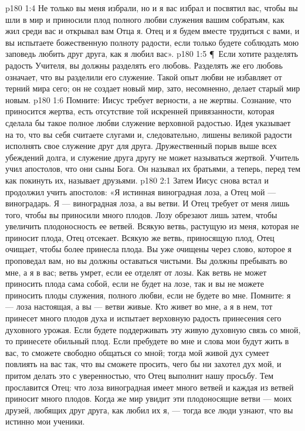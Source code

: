 \vs p180 1:4 Не только вы меня избрали, но и я вас избрал и посвятил вас, чтобы вы шли в мир и приносили плод полного любви служения вашим собратьям, как жил среди вас и открывал вам Отца я. Отец и я будем вместе трудиться с вами, и вы испытаете божественную полноту радости, если только будете соблюдать мою заповедь любить друг друга, как я любил вас».
\vs p180 1:5 \P\ Если хотите разделять радость Учителя, вы должны разделять его любовь. Разделять же его любовь означает, что вы разделили его служение. Такой опыт любви не избавляет от терний мира сего; он не создает новый мир, зато, несомненно, делает старый мир новым.
\vs p180 1:6 Помните: Иисус требует верности, а не жертвы. Сознание, что приносится жертва, есть отсутствие той искренней привязанности, которая сделала бы такое полное любви служение верховной радостью. Идея  указывает на то, что вы себя считаете слугами и, следовательно, лишены великой радости исполнять свое служение друг для друга. Дружественный порыв выше всех убеждений долга, и служение друга другу не может называться жертвой. Учитель учил апостолов, что они сыны Бога. Он называл их братьями, а теперь, перед тем как покинуть их, называет друзьями.
\vs p180 2:1 Затем Иисус снова встал и продолжил учить апостолов: «Я истинная виноградная лоза, а Отец мой --- виноградарь. Я --- виноградная лоза, а вы ветви. И Отец требует от меня лишь того, чтобы вы приносили много плодов. Лозу обрезают лишь затем, чтобы увеличить плодоносность ее ветвей. Всякую ветвь, растущую из меня, которая не приносит плода, Отец отсекает. Всякую же ветвь, приносящую плод, Отец очищает, чтобы более принесла плода. Вы уже очищены через слово, которое я проповедал вам, но вы должны оставаться чистыми. Вы должны пребывать во мне, а я в вас; ветвь умрет, если ее отделят от лозы. Как ветвь не может приносить плода сама собой, если не будет на лозе, так и вы не можете приносить плоды служения, полного любви, если не будете во мне. Помните: я --- лоза настоящая, а вы --- ветви живые. Кто живет во мне, а я в нем, тот принесет много плодов духа и испытает верховную радость принесения сего духовного урожая. Если будете поддерживать эту живую духовную связь со мной, то принесете обильный плод. Если пребудете во мне и слова мои будут жить в вас, то сможете свободно общаться со мной; тогда мой живой дух сумеет повлиять на вас так, что вы сможете просить, чего бы ни захотел дух мой, и притом делать это с уверенностью, что Отец выполнит нашу просьбу. Тем прославится Отец: что лоза виноградная имеет много ветвей и каждая из ветвей приносит много плодов. Когда же мир увидит эти плодоносящие ветви --- моих друзей, любящих друг друга, как любил их я, --- тогда все люди узнают, что вы истинно мои ученики.
